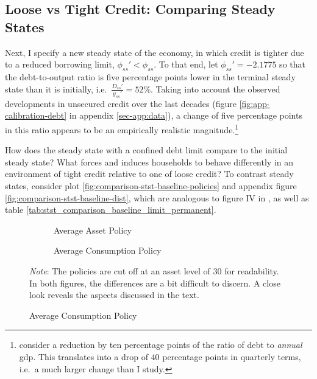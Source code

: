 \documentclass[a4paper,12pt]{article} %
\numberwithin{equation}{section} %
\numberwithin{figure}{section}
\numberwithin{table}{section}
\begin{document}
\subsection{Loose vs Tight Credit: Comparing Steady States}
\label{sec:limit-stst-tight}

Next, I specify a new steady state of the economy, in which credit is tighter due to a reduced borrowing limit, $\phi_{ss}' < \phi_{ss}$. To that end, let $\phi_{ss}' = -2.1775$ so that the debt-to-output ratio is five percentage points lower in the terminal steady state than it is initially, i.e.~$\frac{D_{ss}'}{y_{ss}'} = 52\%$. Taking into account the observed developments in unsecured credit over the last decades (figure \ref{fig:app-calibration-debt} in appendix \ref{sec-app:data}), a change of five percentage points in this ratio appears to be an empirically realistic magnitude.\footnote{\textcite{gl2017} consider a reduction by ten percentage points of the ratio of debt to \textit{annual} \Gls{gdp}. This translates into a drop of $40$ percentage points in quarterly terms, i.e.~a much larger change than I study.} 

How does the steady state with a confined debt limit compare to the initial steady state? What forces and induces households to behave differently in an environment of tight credit relative to one of loose credit? To contrast steady states, consider plot \ref{fig:comparison-stst-baseline-policies} and appendix figure \ref{fig:comparison-stst-baseline-dist}, which are analogous to figure IV in \textcite[p.1443]{gl2017}, as well as table \ref{tab:stst_comparison_baseline_limit_permanent}. 

\begin{figure}[t]
    \caption{Baseline Model -- Shock to Borrowing Limit: Household Policies}
    \label{fig:comparison-stst-baseline-policies}
    \centering
    \begin{subfigure}[b]{0.49\textwidth}
    \caption{Average Asset Policy}
    \label{fig:comparison-stst-baseline-policies-a}
         \centering
         
     \end{subfigure}
     \hfill
     \begin{subfigure}[b]{0.49\textwidth}
     \caption{Average Consumption Policy}
     \label{fig:comparison-stst-baseline-policies-c}
         \centering
         
     \end{subfigure}

    \vspace{10pt}
     
     \justifying
     \footnotesize
	\textit{Note}: The policies are cut off at an asset level of $30$ for readability. In both figures, the differences are a bit difficult to discern. A close look reveals the aspects discussed in the text.
\end{figure}
\end{document}

